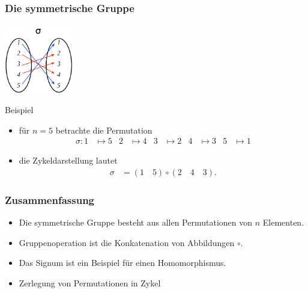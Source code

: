 \documentclass{beamer}
\newcommand{\ue}{\"u}
\begin{document}
\begin{frame}\frametitle{Die symmetrische Gruppe}
	\hfill\includegraphics[height=30mm]{pics/cycledecomp.pdf}
	\begin{block}{Beispiel}
	\begin{itemize}
	\item f\ue r $n=5$ betrachte die Permutation
		\begin{align*}
			\sigma:1&\mapsto5&2&\mapsto4&3&\mapsto2&4&\mapsto3&5&\mapsto1
		\end{align*}
	\item die Zykeldarstellung lautet
		\begin{align*}
			\sigma&=(1\quad 5)\circ(2\quad 4\quad 3).
		\end{align*}
	\end{itemize}
	\end{block}
\end{frame}

\begin{frame}\frametitle{Zusammenfassung}
\begin{itemize}
\item Die symmetrische Gruppe besteht aus allen Permutationen von $n$ Elementen.
\item Gruppenoperation ist die Konkatenation von Abbildungen $\circ$.
\item Das Signum ist ein Beispiel f\ue r einen Homomorphismus.
\item Zerlegung von Permutationen in Zykel
\end{itemize}
\end{frame}
\end{document}
